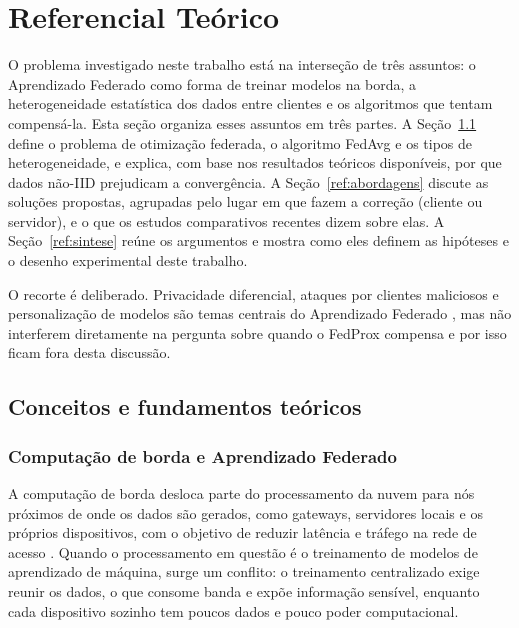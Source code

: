 \section{Referencial Teórico}
\label{referencial}

O problema investigado neste trabalho está na interseção de três assuntos: o Aprendizado Federado como forma de treinar modelos na borda, a heterogeneidade estatística dos dados entre clientes e os algoritmos que tentam compensá-la. Esta seção organiza esses assuntos em três partes. A Seção~\ref{ref:conceitos} define o problema de otimização federada, o algoritmo FedAvg e os tipos de heterogeneidade, e explica, com base nos resultados teóricos disponíveis, por que dados não-IID prejudicam a convergência. A Seção~\ref{ref:abordagens} discute as soluções propostas, agrupadas pelo lugar em que fazem a correção (cliente ou servidor), e o que os estudos comparativos recentes dizem sobre elas. A Seção~\ref{ref:sintese} reúne os argumentos e mostra como eles definem as hipóteses e o desenho experimental deste trabalho.

O recorte é deliberado. Privacidade diferencial, ataques por clientes maliciosos e personalização de modelos são temas centrais do Aprendizado Federado \citep{kairouz2021advances}, mas não interferem diretamente na pergunta sobre quando o FedProx compensa e por isso ficam fora desta discussão.

\subsection{Conceitos e fundamentos teóricos}
\label{ref:conceitos}

\subsubsection{Computação de borda e Aprendizado Federado}

A computação de borda desloca parte do processamento da nuvem para nós próximos de onde os dados são gerados, como gateways, servidores locais e os próprios dispositivos, com o objetivo de reduzir latência e tráfego na rede de acesso \citep{shi2016edge}. Quando o processamento em questão é o treinamento de modelos de aprendizado de máquina, surge um conflito: o treinamento centralizado exige reunir os dados, o que consome banda e expõe informação sensível, enquanto cada dispositivo sozinho tem poucos dados e pouco poder computacional.

